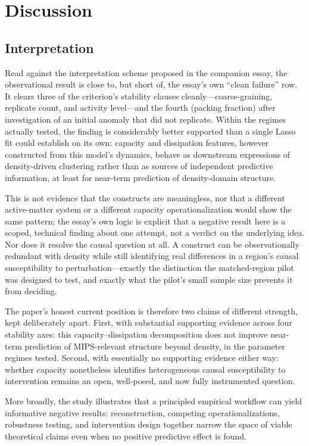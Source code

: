 \documentclass[11pt]{article}
\begin{document}
\section{Discussion}

\subsection{Interpretation}

Read against the interpretation scheme proposed in the companion essay, the observational result is close to, but short of, the essay's own ``clean failure'' row. It clears three of the criterion's stability clauses cleanly---coarse-graining, replicate count, and activity level---and the fourth (packing fraction) after investigation of an initial anomaly that did not replicate. Within the regimes actually tested, the finding is considerably better supported than a single Lasso fit could establish on its own: capacity and dissipation features, however constructed from this model's dynamics, behave as downstream expressions of density-driven clustering rather than as sources of independent predictive information, at least for near-term prediction of density-domain structure.

This is not evidence that the constructs are meaningless, nor that a different active-matter system or a different capacity operationalization would show the same pattern; the essay's own logic is explicit that a negative result here is a scoped, technical finding about one attempt, not a verdict on the underlying idea. Nor does it resolve the causal question at all. A construct can be observationally redundant with density while still identifying real differences in a region's causal susceptibility to perturbation---exactly the distinction the matched-region pilot was designed to test, and exactly what the pilot's small sample size prevents it from deciding.

The paper's honest current position is therefore two claims of different strength, kept deliberately apart. First, with substantial supporting evidence across four stability axes: this capacity--dissipation decomposition does not improve near-term prediction of MIPS-relevant structure beyond density, in the parameter regimes tested. Second, with essentially no supporting evidence either way: whether capacity nonetheless identifies heterogeneous causal susceptibility to intervention remains an open, well-posed, and now fully instrumented question.

More broadly, the study illustrates that a principled empirical workflow can yield informative negative results: reconstruction, competing operationalizations, robustness testing, and intervention design together narrow the space of viable theoretical claims even when no positive predictive effect is found.
\end{document}

